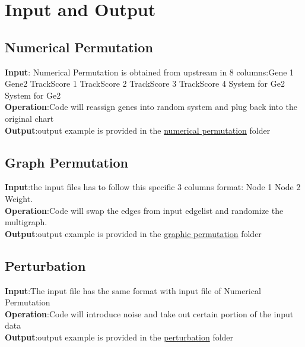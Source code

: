 \documentclass[doublespaced, 12pt]{article}
\begin{document}
\section{Input and Output}
\subsection{Numerical Permutation}
\textbf{Input}: Numerical Permutation is obtained from upstream in 8 columns:Gene 1   Gene2   TrackScore 1  TrackScore 2  TrackScore 3  TrackScore 4  System for Ge2  System for Ge2\\
\textbf{Operation}:Code will reassign genes into random system and plug back into the original chart\\
\textbf{Output}:output example is provided in the \underline{numerical permutation} folder

\subsection{Graph Permutation}
\textbf{Input}:the input files has to follow this specific 3 columns format: Node 1   Node 2   Weight.\\
\textbf{Operation}:Code will swap the edges from input edgelist and randomize the multigraph.\\
\textbf{Output}:output example is provided in the \underline{graphic permutation} folder

\subsection{Perturbation}
\textbf{Input}:The input file has the same format with input file of Numerical Permutation\\
\textbf{Operation}:Code will introduce noise and take out certain portion of the input data\\
\textbf{Output}:output example is provided in the \underline{perturbation} folder
\end{document}
